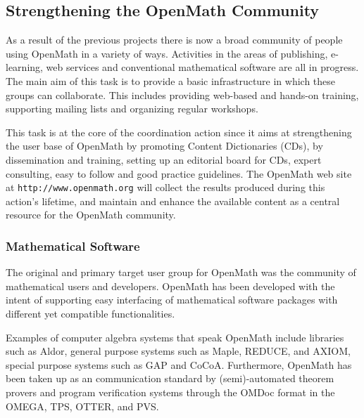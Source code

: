 \documentclass{euproposal}
\begin{document}
\subsection{Strengthening the OpenMath Community}\label{community}


As a result of the previous projects there is now a broad community of
people using OpenMath in a variety of ways.  Activities in the areas
of publishing, e-learning, web services and conventional mathematical
software are all in progress.  The main aim of this task is to provide
a basic infrastructure in which these groups can collaborate. This
includes providing web-based and hands-on training, supporting mailing
lists and organizing regular workshops.

This task is at the core of the coordination action since it aims at
strengthening the user base of OpenMath by promoting Content
Dictionaries (CDs), by dissemination and training, setting up an editorial
board for CDs, expert consulting, easy to follow and good practice
guidelines. The OpenMath web site at \texttt{http://www.openmath.org}
will collect the results produced during this action's lifetime, and
maintain and enhance the available content as a central resource for
the OpenMath community. 





\subsubsection{Mathematical Software}\label{sec:msw}

The original and primary target user group for OpenMath was the
community of mathematical users and developers. OpenMath has been
developed with the intent of supporting easy interfacing of
mathematical software packages with different yet compatible
functionalities.

Examples of computer algebra systems that speak OpenMath include libraries such as
Aldor, general purpose systems such as Maple, REDUCE, and AXIOM, special purpose
systems such as GAP and CoCoA. Furthermore, OpenMath has been taken up as an
communication standard by (semi)-automated theorem provers and program
verification systems through the OMDoc format in the OMEGA, TPS, OTTER, and PVS.
\end{document}
